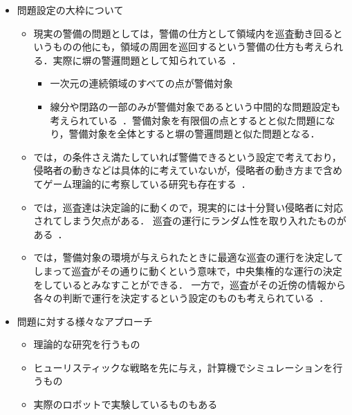 \begin{itemize}
  \item 問題設定の大枠について
  \begin{itemize}
    \item 現実の警備の問題としては，警備の仕方として領域内を巡査動き回るというものの他にも，領域の周囲を巡回するという警備の仕方も考えられる．実際に塀の警邏問題として知られている~\cite{czyzowicz2011boundary, dumitrescu2014fence, kawamura2015fence}．
    \begin{itemize}
      \item 一次元の連続領域のすべての点が警備対象
      \item 線分や閉路の一部のみが警備対象であるという中間的な問題設定も考えられている~\cite{collins2013optimal}．警備対象を有限個の点とすると{\patProb}と似た問題になり，警備対象を全体とすると塀の警邏問題と似た問題となる．
    \end{itemize}
    \item {\patProb}では，{\maxIdletime}の条件さえ満たしていれば警備できるという設定で考えており，侵略者の動きなどは具体的に考えていないが，侵略者の動き方まで含めてゲーム理論的に考察している研究も存在する~\cite{brazdil2015strategy, papadaki2016patrolling}．
    \item {\patProb}では，巡査達は決定論的に動くので，現実的には十分賢い侵略者に対応されてしまう欠点がある．
    巡査の運行にランダム性を取り入れたものがある~\cite{}．
    \item {\patProb}では，警備対象の環境が与えられたときに最適な巡査の運行を決定してしまって巡査がその通りに動くという意味で，中央集権的な運行の決定をしているとみなすことができる．
    一方で，巡査がその近傍の情報から各々の判断で運行を決定するという設定のものも考えられている~\cite{}．
  \end{itemize}

  \item 問題に対する様々なアプローチ
  \begin{itemize}
    \item 理論的な研究を行うもの
    \item ヒューリスティックな戦略を先に与え，計算機でシミュレーションを行うもの
    \item 実際のロボットで実験しているものもある
  \end{itemize}


\end{itemize}
